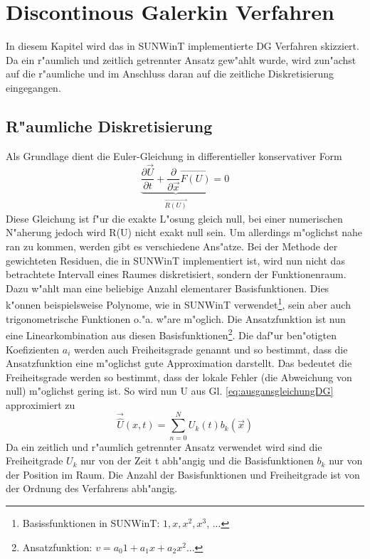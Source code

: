 \newpage
\chapter{Discontinous Galerkin Verfahren}
In diesem Kapitel wird das in SUNWinT implementierte DG Verfahren skizziert. Da ein r"aumlich und zeitlich getrennter Ansatz gew"ahlt wurde, wird zun"achst auf die r"aumliche und im Anschluss daran auf die zeitliche Diskretisierung eingegangen.

\section{R"aumliche Diskretisierung}
Als Grundlage dient die Euler-Gleichung in differentieller konservativer Form
\begin{equation}\label{eq:ausgansgleichungDG}
	\underbrace{\frac{\partial \vec{U}}{\partial t}+ \frac{\partial}{\partial \vec{x}} \vec{F(U)}}_{\substack{\vec{R(U)}}} = 0
\end{equation}
Diese Gleichung ist f"ur die exakte L"osung gleich null, bei einer numerischen N"aherung jedoch wird R(U) nicht exakt null sein. Um allerdings m"oglichst nahe ran zu kommen, werden gibt es verschiedene Ans"atze.
Bei der Methode der gewichteten Residuen, die in SUNWinT implementiert ist, wird nun nicht das betrachtete Intervall eines Raumes diskretisiert, sondern der Funktionenraum. Dazu w"ahlt man eine beliebige Anzahl elementarer Basisfunktionen. Dies k"onnen beispielsweise Polynome, wie in SUNWinT verwendet\footnote{Basissfunktionen in SUNWinT: $1, x, x^2, x^3$, ...}, sein aber auch trigonometrische Funktionen o."a. w"are m"oglich. Die Ansatzfunktion ist nun eine Linearkombination aus diesen Basisfunktionen\footnote{Ansatzfunktion: $v = a_{0}1+a_{1}x+a_{2}x^2$...}. Die daf"ur ben"otigten Koefizienten $a_{i}$ werden auch Freiheitsgrade genannt und so bestimmt, dass die Ansatzfunktion eine m"oglichst gute Approximation darstellt. Das bedeutet die Freiheitsgrade werden so bestimmt, dass der lokale Fehler (die Abweichung von null) m"oglichst gering ist.
So wird nun U aus Gl. \ref{eq:ausgansgleichungDG} approximiert zu 
\begin{equation}\label{eq:Uansatz}
	\vec{\hat{U}}(x, t) = \sum_{n=0}^N U_{k}(t)b_{k}(\vec{x})
\end{equation}
Da ein zeitlich und r"aumlich getrennter Ansatz verwendet wird sind die Freiheitgrade $U_{k}$ nur von der Zeit t abh"angig und die Basisfunktionen $b_{k}$ nur von der Position im Raum. Die Anzahl der Basisfunktionen und Freiheitgrade ist von der Ordnung des Verfahrens abh"angig.
